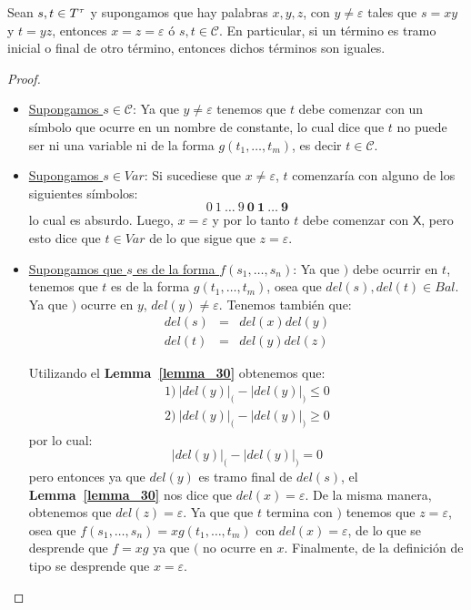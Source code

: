   \begin{lemma} \label{lemma_33}
    \PN Sean $s, t \in T^{\tau}$ y supongamos que hay palabras $x,y,z$, con $y \neq \varepsilon$ tales que $s = xy$ y
    $t = yz$, entonces $x = z = \varepsilon$ ó $s, t \in \mathcal{C}$. En particular, si un término es tramo inicial o
    final de otro término, entonces dichos términos son iguales.
  \end{lemma}
  \begin{proof}
    \begin{itemize}
      \item \underline{Supongamos $s \in \mathcal{C}$}: Ya que $y \neq \varepsilon$ tenemos que $t$ debe comenzar con un
        símbolo que ocurre en un nombre de constante, lo cual dice que $t$ no puede ser ni una variable ni de la forma
        $g(t_{1}, \dotsc, t_{m})$, es decir $t \in \mathcal{C}$.

      \item \underline{Supongamos $s \in Var$}: Si sucediese que $x \neq \varepsilon$, $t$ comenzaría con alguno de los
        siguientes símbolos:
        \[
          \mathit{0} \ \mathit{1} \ \dotsc \ \mathit{9} \ \mathbf{0} \ \mathbf{1} \ \dotsc \ \mathbf{9}
        \]
        \PN lo cual es absurdo. Luego, $x = \varepsilon$ y por lo tanto $t$ debe comenzar con $\mathsf{X}$, pero esto
        dice que $t \in Var$ de lo que sigue que $z = \varepsilon$.

      \item \underline{Supongamos que $s$ es de la forma $f(s_{1}, \dotsc, s_{n})$}: Ya que $)$ debe ocurrir en $t$,
        tenemos que $t$ es de la forma $g(t_{1}, \dotsc, t_{m})$, osea que $del(s), del(t) \in Bal$. Ya que $)$ ocurre
        en $y$, $del(y) \neq \varepsilon$. Tenemos también que:
        \begin{eqnarray*}
          del(s) &=& del(x)del(y) \\
          del(t) &=& del(y)del(z)
        \end{eqnarray*}

        \PN Utilizando el \textbf{Lemma~\ref{lemma_30}} obtenemos que:
        \begin{eqnarray*}
          1) \ \lvert del(y) \rvert_{(} - \lvert del(y) \rvert_{)} \leq 0 \\
          2) \ \lvert del(y) \rvert_{(} - \lvert del(y) \rvert_{)} \geq 0
        \end{eqnarray*}
        \PN por lo cual:
        \[
          \lvert del(y) \rvert_{(} - \lvert del(y) \rvert_{)} = 0
        \]
        \PN pero entonces ya que $del(y)$ es tramo final de $del(s)$, el \textbf{Lemma~\ref{lemma_30}} nos dice que
        $del(x) = \varepsilon$. De la misma manera, obtenemos que $del(z) = \varepsilon$. Ya que que $t$ termina con $)$
        tenemos que $z = \varepsilon$, osea que $f(s_{1}, \dotsc, s_{n}) = xg(t_{1}, \dotsc, t_{m})$ con $del(x) =
        \varepsilon$, de lo que se desprende que $f=xg$ ya que $($ no ocurre en $x$. Finalmente, de la definición de
        tipo se desprende que $x = \varepsilon$.
    \end{itemize}
  \end{proof}

